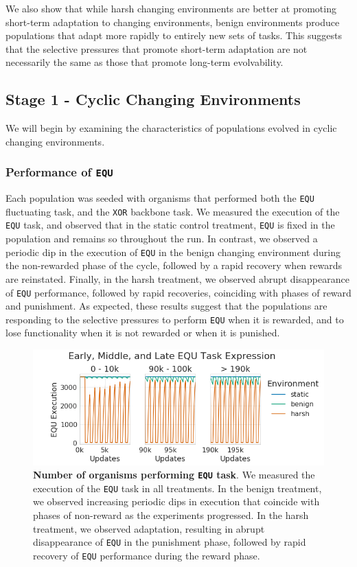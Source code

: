 \documentclass[10pt,letterpaper]{article}
\begin{document}
We also show that while harsh changing environments are better at promoting short-term adaptation to changing environments, benign environments produce populations that adapt more rapidly to entirely new sets of tasks. This suggests that the selective pressures that promote short-term adaptation are not necessarily the same as those that promote long-term evolvability.

\subsection*{Stage 1 - Cyclic Changing Environments}
We will begin by examining the characteristics of populations evolved in cyclic changing environments.

\subsubsection*{Performance of \texttt{EQU}}
Each population was seeded with organisms that performed both the \texttt{EQU} fluctuating task, and the \texttt{XOR} backbone task. We measured the execution of the \texttt{EQU} task, and observed that in the static control treatment, \texttt{EQU} is fixed in the population and remains so throughout the run. In contrast, we observed a periodic dip in the execution of \texttt{EQU} in the benign changing environment during the non-rewarded phase of the cycle, followed by a rapid recovery when rewards are reinstated. Finally, in the harsh treatment, we observed abrupt disappearance of \texttt{EQU} performance, followed by rapid recoveries, coinciding with phases of reward and punishment. As expected, these results suggest that the populations are responding to the selective pressures to perform \texttt{EQU} when it is rewarded, and to lose functionality when it is not rewarded or when it is punished.

	\begin{figure}[!h]
	\includegraphics[width=0.95\columnwidth]{figures/CE/CCE_equ_execution.png}
	\caption{\textbf{Number of organisms performing \texttt{EQU} task}. We measured the execution of the \texttt{EQU} task in all treatments. In the benign treatment, we observed increasing periodic dips in execution that coincide with phases of non-reward as the experiments progressed. In the harsh treatment, we observed adaptation, resulting in abrupt disappearance of \texttt{EQU} in the punishment phase, followed by rapid recovery of \texttt{EQU} performance during the reward phase.
	}
	\label{fig:CCE_equ_execution} %
	\end{figure}
\end{document}
